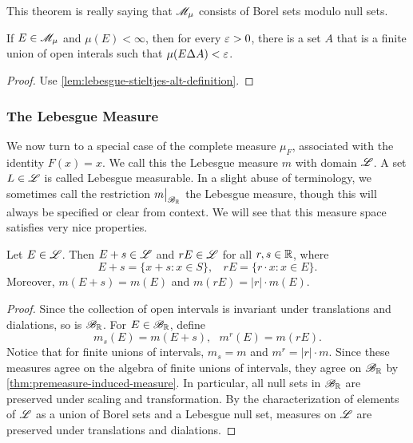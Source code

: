 \documentclass[12pt]{article} %
\begin{document}
\begin{remark}
    This theorem is really saying that $\mathscr{M}_\mu$ consists of Borel sets modulo null sets.
\end{remark}

\begin{proposition}\label{prop:lebesgue-stieltjes-symmetric-difference}
    If $E \in \mathscr{M}_\mu$ and $\mu(E) < \infty$, then for every $\varepsilon > 0$, there is a set $A$ that is a finite union of open interals such that $\mu(E \Delta A) < \varepsilon$.
\end{proposition}

\begin{proof}
    Use \cref{lem:lebesgue-stieltjes-alt-definition}.
\end{proof}

\subsubsection{The Lebesgue Measure}

We now turn to a special case of the complete measure $\mu_F$, associated with the identity $F(x) = x$. We call this the Lebesgue measure $m$ with domain $\mathscr{L}$. A set $L \in \mathscr{L}$ is called Lebesgue measurable. In a slight abuse of terminology, we sometimes call the restriction $\restr{m}{\SB_\R}$ the Lebesgue measure, though this will always be specified or clear from context. We will see that this measure space satisfies very nice properties.

\begin{theorem}
    Let $E \in \mathscr{L}$. Then $E + s \in \mathscr{L}$ and $rE \in \mathscr{L}$ for all $r, s \in \mathbb{R}$, where \[E + s = \{x + s : x \in S\}, \ \ \ \ rE = \{r \cdot x : x \in E\}.\] Moreover, $m(E + s) = m(E)$ and $m(rE) = |r| \cdot m(E)$.
\end{theorem}

\begin{proof}
    Since the collection of open intervals is invariant under translations and dialations, so is $\mathscr{B}_{\mathbb{R}}$. For $E \in \mathscr{B}_{\mathbb{R}}$, define \[m_s(E) = m(E + s), \ \ \ m^r(E) = m(rE).\] Notice that for finite unions of intervals, $m_s = m$ and $m^r = |r| \cdot m$. Since these measures agree on the algebra of finite unions of intervals, they agree on $\mathscr{B}_{\mathbb{R}}$ by \cref{thm:premeasure-induced-measure}. In particular, all null sets in $\mathscr{B}_{\mathbb{R}}$ are preserved under scaling and transformation. By the characterization of elements of $\mathscr{L}$ as a union of Borel sets and a Lebesgue null set, measures on $\mathscr{L}$ are preserved under translations and dialations.
\end{proof}
\end{document}

